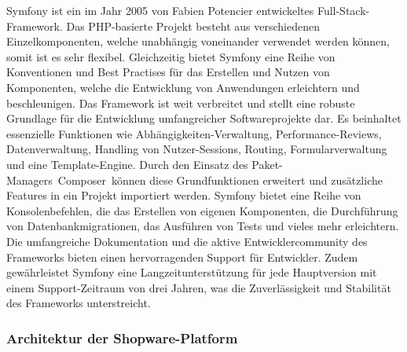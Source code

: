Symfony ist ein im Jahr 2005 von Fabien Potencier entwickeltes Full-Stack-Framework.
Das PHP-basierte Projekt besteht aus verschiedenen Einzelkomponenten, welche unabhängig voneinander verwendet werden
können, somit ist es sehr flexibel.
Gleichzeitig bietet Symfony eine Reihe von Konventionen und Best Practises für das Erstellen und Nutzen von Komponenten,
welche die Entwicklung von Anwendungen erleichtern und beschleunigen.
Das Framework ist weit verbreitet und stellt eine robuste Grundlage für die Entwicklung umfangreicher Softwareprojekte
dar.
Es beinhaltet essenzielle Funktionen wie Abhängigkeiten-Verwaltung, Performance-Reviews, Datenverwaltung,
Handling von Nutzer-Sessions, Routing, Formularverwaltung und eine Template-Engine.
Durch den Einsatz des Paket-Managers\ \glqq Composer\grqq\ können diese Grundfunktionen erweitert und zusätzliche
Features in ein Projekt importiert werden.
Symfony bietet eine Reihe von Konsolenbefehlen, die das Erstellen von eigenen Komponenten, die Durchführung von
Datenbankmigrationen, das Ausführen von Tests und vieles mehr erleichtern.
Die umfangreiche Dokumentation und die aktive Entwicklercommunity des Frameworks bieten einen hervorragenden Support
für Entwickler.
Zudem gewährleistet Symfony eine Langzeitunterstützung für jede Hauptversion mit einem Support-Zeitraum von drei Jahren,
was die Zuverlässigkeit und Stabilität des Frameworks unterstreicht.

\subsubsection{Architektur der Shopware-Platform}

